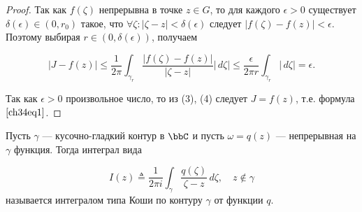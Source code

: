 \begin{proof}
Так как $f(\zeta)$ непрерывна в точке $z \in G$, то для каждого $\epsilon > 0$ существует $\delta(\epsilon) \in (0, r_0)$ такое, что $\forall \zeta : |\zeta - z| < \delta(\epsilon)$ следует $|f(\zeta) - f(z)| < \epsilon$. Поэтому выбирая $r \in (0, \delta(\epsilon))$, получаем

\begin{equation} \label{ch34eq4}
|J - f(z)| \le \frac{1}{2\pi} \int_{\gamma_r} \frac{|f(\zeta) - f(z)|}{|\zeta - z|}|\,d\zeta| \le 
\frac{\epsilon}{2 \pi r} \int_{\gamma_r} |\,d\zeta| = \epsilon.
\end{equation}

Так как $\epsilon > 0$ произвольное число, то из (3), (4) следует $J = f(z)$, т.е. формула $\eqref{ch34eq1}$.
\end{proof}

\begin{defn}\label{ch34defn1}
Пусть $\gamma$ — кусочно-гладкий контур в $\bbC$ и пусть $\omega = q(z)$ — непрерывная на $\gamma$ функция. Тогда интеграл вида

\begin{equation} \label{ch34eq5}
I(z) \triangleq \frac{1}{2 \pi i} \int_\gamma \frac{q(\zeta)}{\zeta - z}\,d\zeta, \quad z \notin \gamma
\end{equation}
называется интегралом типа Коши по контуру $\gamma$ от функции $q$.
\end{defn}

